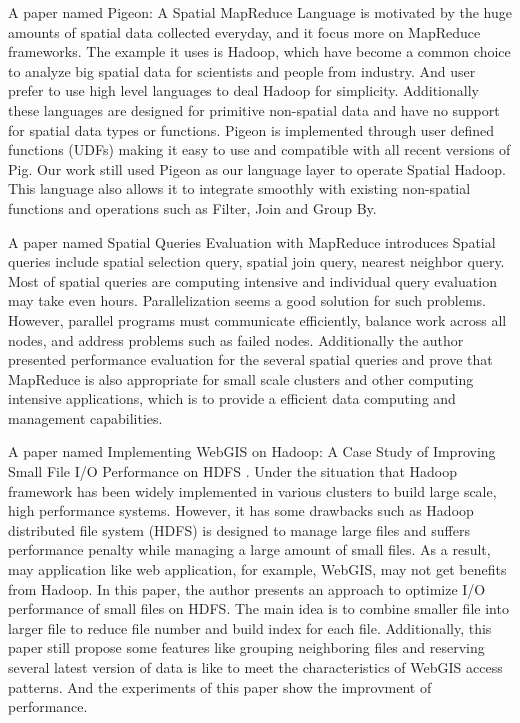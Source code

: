 A paper named Pigeon: A Spatial MapReduce Language \cite{eldawy2014pigeon} is motivated by the huge amounts of spatial data collected everyday, and it focus more on MapReduce frameworks. The example it uses is Hadoop, which have become a common choice to analyze big spatial data for scientists and people from industry. And user prefer to use high level languages to deal Hadoop for simplicity. Additionally  these languages are designed for primitive non-spatial data and have no support for spatial data types or functions. Pigeon is implemented through user defined functions (UDFs) making it easy to use and compatible with all recent versions of Pig. Our work still used Pigeon as our language layer to operate Spatial Hadoop. This language also allows it to integrate smoothly with existing non-spatial functions and operations such as Filter, Join and Group By.  


A paper named Spatial Queries Evaluation with MapReduce \cite{zhang2009spatial} introduces Spatial queries include spatial selection query, spatial join query, nearest neighbor query. Most of spatial queries are computing intensive and individual query evaluation may take even hours. Parallelization seems a good solution for such problems. However, parallel programs must communicate efficiently, balance work across all nodes, and address problems such as failed nodes. Additionally the author presented performance evaluation for the several spatial queries and prove that MapReduce is also appropriate for small scale clusters and other computing intensive applications, which is to provide a efficient data computing and management capabilities.


A paper named Implementing WebGIS on Hadoop: A Case Study of Improving Small File I/O Performance on HDFS \cite{liu2009implementing} . Under the situation that Hadoop framework has been widely implemented in various clusters to build large scale, high performance systems. However, it has some drawbacks such as Hadoop distributed file system (HDFS) is designed to manage large files and suffers performance penalty while managing a large amount of small files. As a result, may application like web application, for example, WebGIS, may not get benefits from Hadoop. In this paper, the author presents an approach to optimize I/O performance of small files on HDFS.  The main idea is to combine smaller file into larger file to reduce file number and build index for each file. Additionally, this paper still propose some features like grouping neighboring files and reserving several latest version of data is like to meet the characteristics of WebGIS access patterns. And the experiments of this paper show the improvment of performance.


